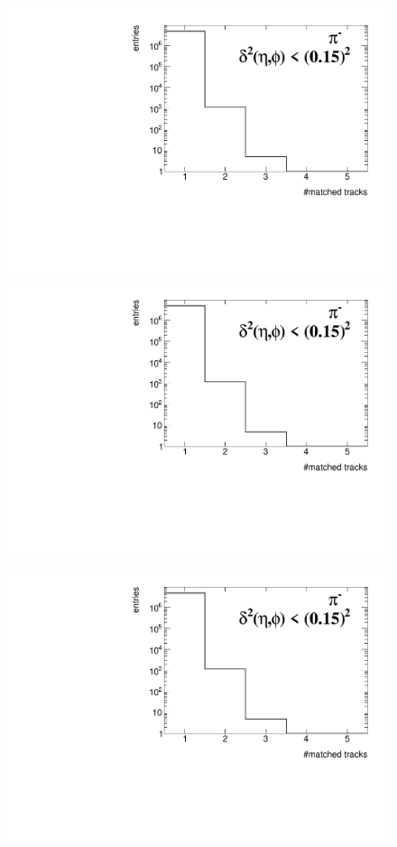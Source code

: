 \begin{figure}[h!]
{	}~
	\parbox{0.329\textwidth}{
		\centering
		\includegraphics[width=\linewidth,page=22]{graphics/eff/trackSplitting_QualityEtaPhiCD.pdf}\\
		\includegraphics[width=\linewidth,page=25]{graphics/eff/trackSplitting_QualityEtaPhiCD.pdf}\\
	}%
	\parbox{0.329\textwidth}{
		\centering
		\includegraphics[width=\linewidth,page=23]{graphics/eff/trackSplitting_QualityEtaPhiCD.pdf}\\
}
\end{figure}
